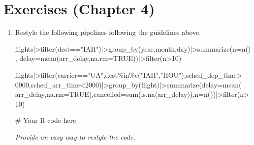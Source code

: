 \documentclass[
  letterpaper,
  DIV=11,
  numbers=noendperiod]{scrreprt}
\newenvironment{Shaded}{\begin{snugshade}}{\end{snugshade}}
\newcommand{\AttributeTok}[1]{\textcolor[rgb]{0.40,0.45,0.13}{#1}}
\newcommand{\CommentTok}[1]{\textcolor[rgb]{0.37,0.37,0.37}{#1}}
\newcommand{\ConstantTok}[1]{\textcolor[rgb]{0.56,0.35,0.01}{#1}}
\newcommand{\DecValTok}[1]{\textcolor[rgb]{0.68,0.00,0.00}{#1}}
\newcommand{\FunctionTok}[1]{\textcolor[rgb]{0.28,0.35,0.67}{#1}}
\newcommand{\NormalTok}[1]{\textcolor[rgb]{0.00,0.23,0.31}{#1}}
\newcommand{\SpecialCharTok}[1]{\textcolor[rgb]{0.37,0.37,0.37}{#1}}
\newcommand{\StringTok}[1]{\textcolor[rgb]{0.13,0.47,0.30}{#1}}
\begin{document}
\hypertarget{exercises-chapter-4}{%
\chapter{Exercises (Chapter 4)}\label{exercises-chapter-4}}

\begin{enumerate}
\def\labelenumi{\arabic{enumi}.}
\item
  Restyle the following pipelines following the guidelines above.

\begin{Shaded}
\begin{Highlighting}[]
\NormalTok{flights}\SpecialCharTok{|\textgreater{}}\FunctionTok{filter}\NormalTok{(dest}\SpecialCharTok{==}\StringTok{"IAH"}\NormalTok{)}\SpecialCharTok{|\textgreater{}}\FunctionTok{group\_by}\NormalTok{(year,month,day)}\SpecialCharTok{|\textgreater{}}\FunctionTok{summarize}\NormalTok{(}\AttributeTok{n=}\FunctionTok{n}\NormalTok{(),}
\AttributeTok{delay=}\FunctionTok{mean}\NormalTok{(arr\_delay,}\AttributeTok{na.rm=}\ConstantTok{TRUE}\NormalTok{))}\SpecialCharTok{|\textgreater{}}\FunctionTok{filter}\NormalTok{(n}\SpecialCharTok{\textgreater{}}\DecValTok{10}\NormalTok{)}

\NormalTok{flights}\SpecialCharTok{|\textgreater{}}\FunctionTok{filter}\NormalTok{(carrier}\SpecialCharTok{==}\StringTok{"UA"}\NormalTok{,dest}\SpecialCharTok{\%in\%}\FunctionTok{c}\NormalTok{(}\StringTok{"IAH"}\NormalTok{,}\StringTok{"HOU"}\NormalTok{),sched\_dep\_time}\SpecialCharTok{\textgreater{}}
\DecValTok{0900}\NormalTok{,sched\_arr\_time}\SpecialCharTok{\textless{}}\DecValTok{2000}\NormalTok{)}\SpecialCharTok{|\textgreater{}}\FunctionTok{group\_by}\NormalTok{(flight)}\SpecialCharTok{|\textgreater{}}\FunctionTok{summarize}\NormalTok{(}\AttributeTok{delay=}\FunctionTok{mean}\NormalTok{(}
\NormalTok{arr\_delay,}\AttributeTok{na.rm=}\ConstantTok{TRUE}\NormalTok{),}\AttributeTok{cancelled=}\FunctionTok{sum}\NormalTok{(}\FunctionTok{is.na}\NormalTok{(arr\_delay)),}\AttributeTok{n=}\FunctionTok{n}\NormalTok{())}\SpecialCharTok{|\textgreater{}}\FunctionTok{filter}\NormalTok{(n}\SpecialCharTok{\textgreater{}}\DecValTok{10}\NormalTok{)}
\end{Highlighting}
\end{Shaded}

  \begin{tcolorbox}[enhanced jigsaw, breakable, bottomtitle=1mm, left=2mm, colback=white, toprule=.15mm, leftrule=.75mm, colframe=quarto-callout-note-color-frame, colbacktitle=quarto-callout-note-color!10!white, title={Answer}, coltitle=black, toptitle=1mm, bottomrule=.15mm, opacitybacktitle=0.6, arc=.35mm, rightrule=.15mm, titlerule=0mm, opacityback=0]

\begin{Shaded}
\begin{Highlighting}[]
\CommentTok{\# Your R code here}
\end{Highlighting}
\end{Shaded}

  \emph{Provide an easy way to restyle the code.}

  \end{tcolorbox}
\end{enumerate}
\end{document}
